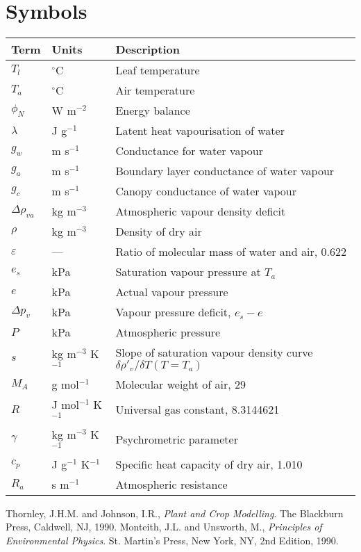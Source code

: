 \documentclass[a4paper]{article}
\begin{document}
\section{Symbols}
\begin{tabularx}{\textwidth}{l | l | X}
Term & Units & Description \\
\hline
$T_l$ & $^{\circ}$C & Leaf temperature \\
$T_a$ & $^{\circ}$C & Air temperature \\
$\phi_N$ & W m$^{-2}$ & Energy balance \\
$\lambda$ & J g$^{-1}$ & Latent heat vapourisation of water \\
$g_w$ & m s$^{-1}$ & Conductance for water vapour \\
$g_a$ & m s$^{-1}$ & Boundary layer conductance of water vapour \\
$g_c$ & m s$^{-1}$ & Canopy conductance of water vapour \\
$\Delta \rho_{va}$ & kg m$^{-3}$ & Atmospheric vapour density deficit \\
$\rho$ & kg m$^{-3}$ & Density of dry air \\
$\varepsilon$ & --- & Ratio of molecular mass of water and air, 0.622 \\
$e_s$ & kPa & Saturation vapour pressure at $T_a$\\
$e$ & kPa & Actual vapour pressure \\
$\Delta p_v$ & kPa & Vapour pressure deficit, $e_s - e$ \\
$P$ & kPa & Atmospheric pressure \\
$s$ & kg m$^{-3}$ K$^{-1}$ & Slope of saturation vapour density curve $\delta \rho'_v / \delta T (T 
= T_a)$ \\
$M_A$ & g mol$^{-1}$ & Molecular weight of air, 29 \\
$R$ & J mol$^{-1}$ K$^{-1}$ & Universal gas constant, 8.3144621 \\
$\gamma$ & kg m$^{-3}$ K$^{-1}$ & Psychrometric parameter \\
$c_p$ & J g$^{-1}$ K$^{-1}$ & Specific heat capacity of dry air, 1.010 \\
$R_a$ & s m$^{-1}$ & Atmospheric resistance \\
\end{tabularx}

\begin{thebibliography}{}
    Thornley, J.H.M. and Johnson, I.R.,
    \emph{Plant and Crop Modelling}.
    The Blackburn Press, Caldwell, NJ, 1990.
    Monteith, J.L. and Unsworth, M.,
    \emph{Principles of Environmental Physics}.
    St. Martin's Press, New York, NY, 2nd Edition, 1990.
\end{thebibliography}
\end{document}
